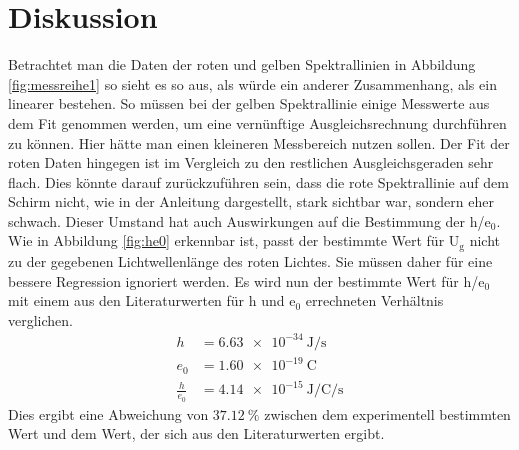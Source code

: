 \section{Diskussion}
\label{sec:Diskussion}

Betrachtet man die Daten der roten und gelben Spektrallinien in Abbildung \ref{fig:messreihe1} so sieht es so aus, als würde ein anderer Zusammenhang, als ein linearer bestehen.
So müssen bei der gelben Spektrallinie einige Messwerte aus dem Fit genommen werden, um eine vernünftige Ausgleichsrechnung durchführen zu können.
Hier hätte man einen kleineren Messbereich nutzen sollen.
Der Fit der roten Daten hingegen ist im Vergleich zu den restlichen Ausgleichsgeraden sehr flach.
Dies könnte darauf zurückzuführen sein, dass die rote Spektrallinie auf dem Schirm nicht, wie in der Anleitung dargestellt, stark sichtbar war, sondern eher schwach.
Dieser Umstand hat auch Auswirkungen auf die Bestimmung der h/e$_0$.
Wie in Abbildung \ref{fig:he0} erkennbar ist, passt der bestimmte Wert für U$_\text{g}$ nicht zu der gegebenen Lichtwellenlänge des roten Lichtes.
Sie müssen daher für eine bessere Regression ignoriert werden.
Es wird nun der bestimmte Wert für h/e$_0$ mit einem aus den Literaturwerten für h\cite{Planck} und e$_0$\cite{Ladung} errechneten Verhältnis verglichen.
\begin{align*}
  h &= \SI{6.63e-34}{\joule\per\second} \\
  e_0 &= \SI{1.60e-19}{\coulomb} \\
  \frac{h}{e_0} &= \SI{4.14e-15}{\joule\per\coulomb\per\second}
\end{align*}
Dies ergibt eine Abweichung von $\SI{37.12}{\percent}$ zwischen dem experimentell bestimmten Wert und dem Wert, der sich aus den Literaturwerten ergibt.
